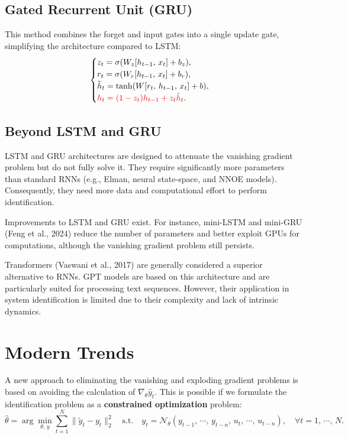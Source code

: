\subsection{Gated Recurrent Unit (GRU)}
This method combines the forget and input gates into a single update gate, simplifying the architecture compared to LSTM:
\[
\begin{cases}
z_t = \sigma(W_z[h_{t-1},\,x_t] + b_z), \\
r_t = \sigma(W_r[h_{t-1},\,x_t] + b_r), \\
\tilde{h}_t = \tanh(W[r_t ,\, h_{t-1},\,x_t] + b), \\
\textcolor{red}{h_t = (1 - z_t) h_{t-1} + z_t \tilde{h}_t}.
\end{cases}
\]

\subsection{Beyond LSTM and GRU}
LSTM and GRU architectures are designed to attenuate the vanishing gradient problem but do not fully solve it.  
They require significantly more parameters than standard RNNs (e.g., Elman, neural state-space, and NNOE models). Consequently, they need more data and computational effort to perform identification.  

Improvements to LSTM and GRU exist. For instance, mini-LSTM and mini-GRU (Feng et al., 2024) reduce the number of parameters and better exploit GPUs for computations, although the vanishing gradient problem still persists.  

Transformers (Vaswani et al., 2017) are generally considered a superior alternative to RNNs. GPT models are based on this architecture and are particularly suited for processing text sequences. However, their application in system identification is limited due to their complexity and lack of intrinsic dynamics.

\section{Modern Trends}

A new approach to eliminating the vanishing and exploding gradient problems is based on avoiding the calculation of \(\nabla_\theta \hat{y}_t\). This is possible if we formulate the identification problem as a \textbf{constrained optimization} problem:
\[
\hat{\theta} = \arg \min\limits_{\theta,\,y} \sum\limits_{t=1}^{N} \|\tilde{y}_t - y_t\|_2^2 
\quad \text{s.t.} \quad y_t = \mathcal{N}_\theta(y_{t-1},\,\cdots,\,y_{t-n},\,u_t,\,\cdots,\,u_{t-n}), \quad \forall t = 1,\,\cdots,\,N.
\]

